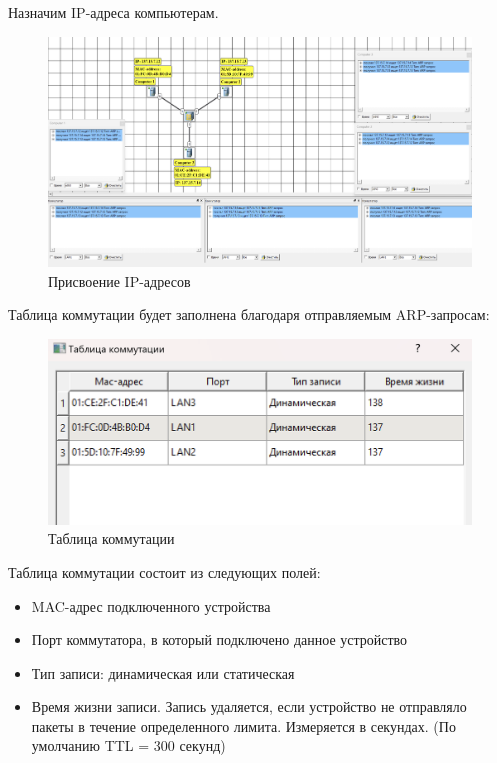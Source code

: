 \documentclass[12pt,onecolumn]{article}
\begin{document}
Назначим IP-адреса компьютерам.
\begin{figure}[H]
  \centering
  \includegraphics[width=\textwidth]{image/part2/topology-ip.png}
  \caption{Присвоение IP-адресов}
\end{figure}
Таблица коммутации будет заполнена благодаря отправляемым ARP-запросам:

\begin{figure}[H]
  \centering
  \includegraphics[width=\textwidth]{image/part2/switch-table.png}
  \caption{Таблица коммутации}
\end{figure}

Таблица коммутации состоит из следующих полей:
\begin{itemize}
  \item MAC-адрес подключенного устройства
  \item Порт коммутатора, в который подключено данное устройство
  \item Тип записи: динамическая или статическая
  \item Время жизни записи. Запись удаляется, если устройство не отправляло пакеты в течение определенного лимита. Измеряется в секундах. (По умолчанию TTL = 300 секунд)
\end{itemize}
\end{document}
